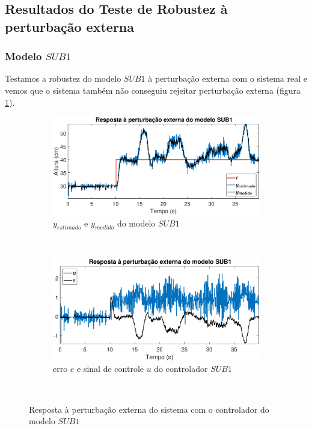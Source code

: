 \subsection{Resultados do Teste de Robustez à perturbação externa}\label{rpe}

\subsubsection{Modelo $SUB1$}
Testamos a robustez do modelo $SUB1$ à perturbação externa com o sistema real e vemos que o sistema também não conseguiu rejeitar perturbação externa (figura \ref{fig:pextrsub1y}).

\begin{figure}[htb]
	\centering
	\begin{subfigure}[t]{0.48\textwidth}
		\includegraphics[width=1\linewidth]{pextrsub1y}
		\caption[$y_{estimado}$ e $y_{medido}$ do modelo $SUB1$]{$y_{estimado}$ e $y_{medido}$ do modelo $SUB1$}
		\label{fig:pextrsub1y}
	\end{subfigure}
	~ %
	\begin{subfigure}[t]{0.48\textwidth}
		\includegraphics[width=1\linewidth]{pextrsub1e}
		\caption[erro $e$ e sinal de controle $u$ do controlador $SUB1$]{erro $e$ e sinal de controle $u$ do controlador $SUB1$}
		\label{fig:pextrsub1e}
	\end{subfigure}
	~ %
	
	\caption{Resposta à perturbação externa do sistema com o controlador do modelo $SUB1$}\label{fig:pextrsub1}
\end{figure}

